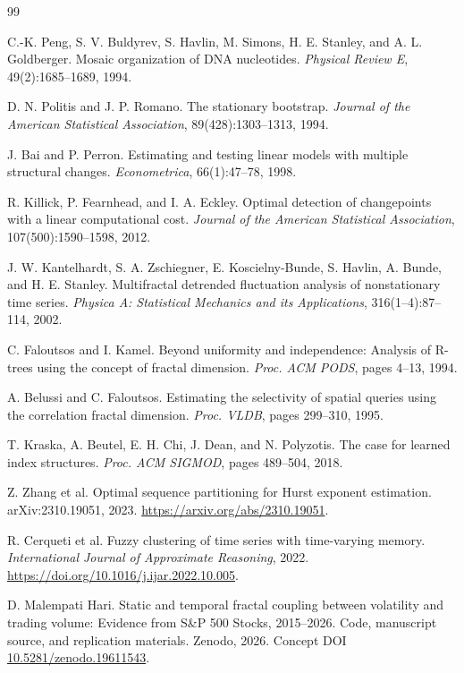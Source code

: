\documentclass[11pt]{article}
\begin{document}
\begin{thebibliography}{99}

C.-K. Peng, S. V. Buldyrev, S. Havlin, M. Simons, H. E. Stanley, and A. L. Goldberger.
Mosaic organization of DNA nucleotides.
\emph{Physical Review E}, 49(2):1685--1689, 1994.

D. N. Politis and J. P. Romano.
The stationary bootstrap.
\emph{Journal of the American Statistical Association}, 89(428):1303--1313, 1994.

J. Bai and P. Perron.
Estimating and testing linear models with multiple structural changes.
\emph{Econometrica}, 66(1):47--78, 1998.

R. Killick, P. Fearnhead, and I. A. Eckley.
Optimal detection of changepoints with a linear computational cost.
\emph{Journal of the American Statistical Association}, 107(500):1590--1598, 2012.

J. W. Kantelhardt, S. A. Zschiegner, E. Koscielny-Bunde, S. Havlin, A. Bunde, and H. E. Stanley.
Multifractal detrended fluctuation analysis of nonstationary time series.
\emph{Physica A: Statistical Mechanics and its Applications}, 316(1--4):87--114, 2002.

C. Faloutsos and I. Kamel.
Beyond uniformity and independence: Analysis of R-trees using the concept of fractal dimension.
\emph{Proc. ACM PODS}, pages 4--13, 1994.

A. Belussi and C. Faloutsos.
Estimating the selectivity of spatial queries using the correlation fractal dimension.
\emph{Proc. VLDB}, pages 299--310, 1995.

T. Kraska, A. Beutel, E. H. Chi, J. Dean, and N. Polyzotis.
The case for learned index structures.
\emph{Proc. ACM SIGMOD}, pages 489--504, 2018.

Z. Zhang et al.
Optimal sequence partitioning for Hurst exponent estimation.
arXiv:2310.19051, 2023.
\url{https://arxiv.org/abs/2310.19051}.

R. Cerqueti et al.
Fuzzy clustering of time series with time-varying memory.
\emph{International Journal of Approximate Reasoning}, 2022.
\url{https://doi.org/10.1016/j.ijar.2022.10.005}.

D. Malempati Hari.
Static and temporal fractal coupling between volatility and trading volume: Evidence from S\&P 500 Stocks, 2015--2026.
Code, manuscript source, and replication materials.
Zenodo, 2026.
Concept DOI \href{https://doi.org/10.5281/zenodo.19611543}{10.5281/zenodo.19611543}.


\end{thebibliography}
\end{document}
